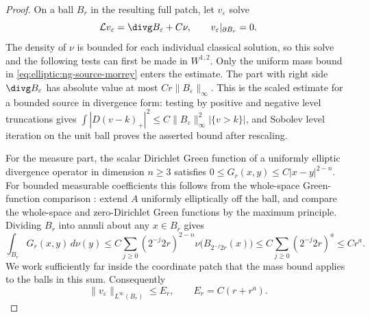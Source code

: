 \begin{proof}
On a ball $B_r$ in the resulting full patch, let $v_\varepsilon$ solve
\begin{equation}\label{eq:elliptic:ng-potential}
 \mathcal L v_\varepsilon=\divg B_\varepsilon+C\nu,
 \qquad v_\varepsilon|_{\partial B_r}=0.
\end{equation}
The density of $\nu$ is bounded for each individual classical solution,
so this solve and the following tests can first be made in $W^{1,2}$.
Only the uniform mass bound in \eqref{eq:elliptic:ng-source-morrey} enters the
estimate.  The part with right side $\divg B_\varepsilon$ has absolute
value at most $Cr\|B_\varepsilon\|_\infty$.  This is the scaled
estimate for a bounded source in divergence form: testing by positive and negative
level truncations gives
$\int|D(v-k)_+|^2\le C\|B_\varepsilon\|_\infty^2
 |\{v>k\}|$, and Sobolev level iteration on the unit ball proves
the asserted bound after rescaling.

For the measure part, the scalar Dirichlet Green function of a
uniformly elliptic divergence operator in dimension $n\ge3$ satisfies
$0\le G_r(x,y)\le C|x-y|^{2-n}$.  For bounded measurable coefficients this follows from the
whole-space Green-function comparison
\cite[Section~7]{LittmanStampacchiaWeinberger1963}: extend $A$
uniformly elliptically off the ball, and compare the whole-space
and zero-Dirichlet Green functions by the maximum principle.  Dividing $B_r$ into annuli about any $x\in B_r$ gives
\[
 \int_{B_r}G_r(x,y)\,d\nu(y)
 \le C\sum_{j\ge0}(2^{-j}2r)^{2-n}
                   \nu\bigl(B_{2^{-j}2r}(x)\bigr)
 \le C\sum_{j\ge0}(2^{-j}2r)^a\le Cr^a.
\]
We work sufficiently far inside the coordinate patch that the mass
bound applies to the balls in this sum.  Consequently
\begin{equation}\label{eq:elliptic:ng-potential-bound}
 \|v_\varepsilon\|_{L^\infty(B_r)}\le E_r,
 \qquad E_r=C(r+r^a).
\end{equation}


\end{proof}
